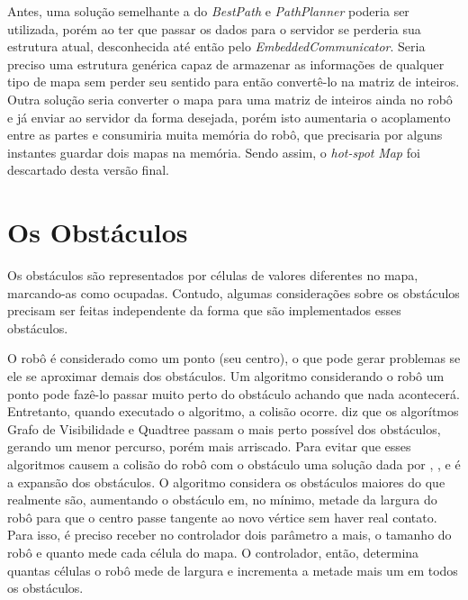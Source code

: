 Antes, uma solução semelhante a do \textit{BestPath} e \textit{PathPlanner} poderia ser utilizada, porém ao ter que passar os dados para o servidor se perderia sua estrutura atual, desconhecida até então pelo \textit{EmbeddedCommunicator}. Seria preciso uma estrutura genérica capaz de armazenar as informações de qualquer tipo de mapa sem perder seu sentido para então convertê-lo na matriz de inteiros. Outra solução seria converter o mapa para uma matriz de inteiros ainda no robô e já enviar ao servidor da forma desejada, porém isto aumentaria o acoplamento entre as partes e consumiria muita memória do robô, que precisaria por alguns instantes guardar dois mapas na memória. Sendo assim, o \textit{hot-spot} \textit{Map} foi descartado desta versão final.

\section{Os Obstáculos}

Os obstáculos são representados por células de valores diferentes no mapa, marcando-as como ocupadas. Contudo, algumas considerações sobre os obstáculos precisam ser feitas independente da forma que são implementados esses obstáculos.

O robô é considerado como um ponto (seu centro), o que pode gerar problemas se ele se aproximar demais dos obstáculos. Um algoritmo considerando o robô um ponto pode fazê-lo passar muito perto do obstáculo achando que nada acontecerá. Entretanto, quando executado o algoritmo, a colisão ocorre. \cite{Guzman2008} diz que os algorítmos Grafo de Visibilidade e Quadtree passam o mais perto possível dos obstáculos, gerando um menor percurso, porém mais arriscado. Para evitar que esses algoritmos causem a colisão do robô com o obstáculo uma solução dada por \cite{Souza2008}, \cite{Guzman2008}, \cite{Siegwart2004} e \cite{Thomsen2010} é a expansão dos obstáculos. O algoritmo considera os obstáculos maiores do que realmente são, aumentando o obstáculo em, no mínimo, metade da largura do robô para que o centro passe tangente ao novo vértice sem haver real contato. Para isso, é preciso receber no controlador dois parâmetro a mais, o tamanho do robô e quanto mede cada célula do mapa. O controlador, então, determina quantas células o robô mede de largura e incrementa a metade mais um em todos os obstáculos.

